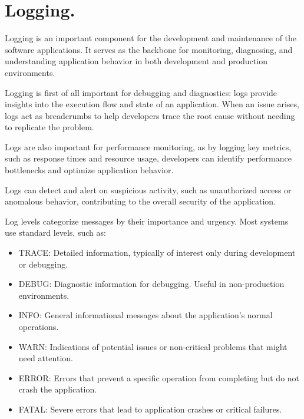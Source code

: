 
\pagebreak
\chapter{Logging.}


\medskip


Logging is an important component for the development and maintenance of the software applications.
It serves as the backbone for monitoring, diagnosing, and understanding application behavior in both development and production environments.

Logging is first of all important for debugging and diagnostics: logs provide insights into the execution flow and state of an application.
When an issue arises, logs act as breadcrumbs to help developers trace the root cause without needing to replicate the problem.

Logs are also important for performance monitoring, as by logging key metrics, such as response times and resource usage, developers can
identify performance bottlenecks and optimize application behavior.

Logs can detect and alert on suspicious activity, such as unauthorized access or anomalous behavior, contributing to the overall security of
the application.

Log levels categorize messages by their importance and urgency. Most systems use standard levels, such as:

\begin{itemize}
\item TRACE: Detailed information, typically of interest only during development or debugging.

\item DEBUG: Diagnostic information for debugging. Useful in non-production environments.

\item INFO: General informational messages about the application’s normal operations.

\item WARN: Indications of potential issues or non-critical problems that might need attention.

\item ERROR: Errors that prevent a specific operation from completing but do not crash the application.

\item FATAL: Severe errors that lead to application crashes or critical failures.
\end{itemize}

